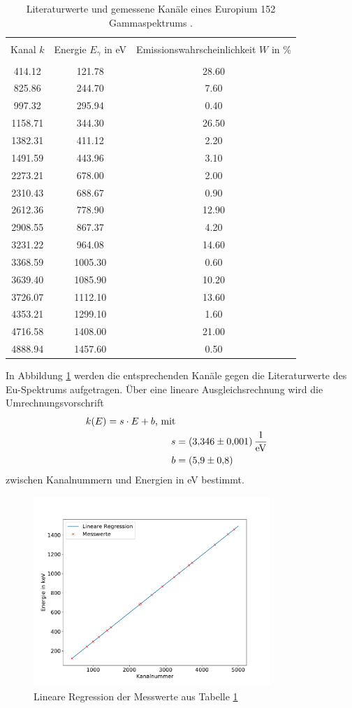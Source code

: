 \begin{table}
\centering
\caption{Literaturwerte und gemessene Kanäle eines Europium 152 Gammaspektrums \cite{sample}.}
\begin{tabular}{c c c}
\hline \\
Kanal $k$ &Energie $E_\gamma$ in eV & Emissionswahrscheinlichkeit $W$ in \% \\
\hline \\
414.12 & 121.78 & 28.60 \\ 825.86 & 244.70 & 7.60 \\ 997.32 & 295.94 & 0.40 \\ 1158.71 & 344.30 & 26.50 \\ 1382.31 & 411.12 & 2.20 \\ 1491.59 & 443.96 & 3.10 \\ 2273.21 & 678.00 & 2.00 \\ 2310.43 & 688.67 & 0.90 \\ 2612.36 & 778.90 & 12.90 \\ 2908.55 & 867.37 & 4.20 \\ 3231.22 & 964.08 & 14.60 \\ 3368.59 & 1005.30 & 0.60 \\ 3639.40 & 1085.90 & 10.20 \\ 3726.07 & 1112.10 & 13.60 \\ 4353.21 & 1299.10 & 1.60 \\ 4716.58 & 1408.00 & 21.00 \\ 4888.94 & 1457.60 & 0.50 \\ 
\hline
\end{tabular}
\label{tab:atab1}
\end{table}
In Abbildung \ref{fig:Kalibrierung} werden die entsprechenden Kanäle gegen die Literaturwerte des Eu-Spektrums aufgetragen. 
Über eine lineare Ausgleichsrechnung wird die Umrechnungsvorschrift
\begin{align*}
k(E) = s \cdot E + b \text{, mit}\\
  s &= \SI{3.346+-0.001}{\per\electronvolt}\\
  b &= \SI{ 5.9+-0.8}{}
\end{align*}
zwischen Kanalnummern und Energien in eV bestimmt.
\begin{figure}
\centering
\includegraphics[width=0.8\textwidth]{python/plots/kalibrierung.pdf}
\caption{Lineare Regression der Messwerte aus Tabelle \ref{tab:atab1}}
\label{fig:Kalibrierung}
\end{figure}
